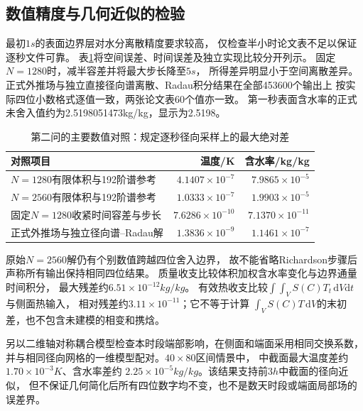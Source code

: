 \subsection{数值精度与几何近似的检验}
最初$1\unit{s}$的表面边界层对水分离散精度要求较高，
仅检查半小时论文表不足以保证逐秒文件可靠。
表\ref{q2-tab-verification}将空间误差、时间误差及独立实现比较分开列示。
固定$N=1280$时，减半容差并将最大步长降至$5\unit{s}$，
所得差异明显小于空间离散差异。
正式外推场与独立直接径向谱离散、Radau积分结果在全部453600个输出上
按实际四位小数格式逐值一致，两张论文表60个值亦一致。
第一秒表面含水率的正式未舍入值约为2.5198051473\unit{kg/kg}，显示为2.5198。

\begin{table}[htbp]
\centering\small
\caption{第二问的主要数值对照：规定逐秒径向采样上的最大绝对差}
\label{q2-tab-verification}
\begin{tabularx}{\textwidth}{@{}Xrr@{}}
\toprule
对照项目 & 温度/\unit{K} & 含水率/\unit{kg/kg}\\
\midrule
$N=1280$有限体积与192阶谱参考 & $4.1407\times10^{-7}$ & $7.9865\times10^{-5}$\\
$N=2560$有限体积与192阶谱参考 & $1.0333\times10^{-7}$ & $1.9903\times10^{-5}$\\
固定$N=1280$收紧时间容差与步长 & $7.6286\times10^{-10}$ & $7.1370\times10^{-11}$\\
正式外推场与独立径向谱--Radau解 & $1.3836\times10^{-9}$ & $1.1461\times10^{-7}$\\
\bottomrule
\end{tabularx}
\end{table}

原始$N=2560$解仍有个别数值跨越四位舍入边界，
故不能省略Richardson步骤后声称所有输出保持相同四位结果。
质量收支比较体积加权含水率变化与边界通量时间积分，
最大残差约$6.51\times10^{-12}\unit{kg/kg}$。
有效热收支比较$\int\!\int_V S(C)T_t\,\mathrm dV\mathrm dt$与侧面热输入，
相对残差约$3.11\times10^{-11}$；它不等于计算
$\int_V S(C)T\,\mathrm dV$的末初差，也不包含未建模的相变和携焓。

另以二维轴对称耦合模型检查本时段端部影响，在侧面和端面采用相同交换系数，
并与相同径向网格的一维模型配对。$40\times80$区间情景中，
中截面最大温度差约$1.70\times10^{-3}\unit{K}$、含水率差约
$2.25\times10^{-5}\unit{kg/kg}$。该结果支持前$3\unit{h}$中截面的径向近似，
但不保证几何简化后所有四位数字均不变，也不是数天时段或端面局部场的误差界。

